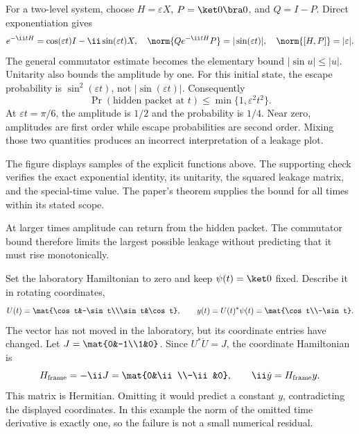 For a two-level system, choose $H=\varepsilon X$, $P=\ket0\bra0$, and $Q=I-P$. Direct exponentiation gives
\[
e^{-\ii tH}=\cos(\varepsilon t)I-\ii\sin(\varepsilon t)X,
\quad
\norm{Qe^{-\ii tH}P}=|\sin(\varepsilon t)|,
\quad\norm{[H,P]}=|\varepsilon|.
\]
The general commutator estimate becomes the elementary bound $|\sin u|\le |u|$. Unitarity also bounds the amplitude by one.
For this initial state, the escape probability is $\sin^2(\varepsilon t)$, not $|\sin(\varepsilon t)|$. Consequently
\[
\Pr(\text{hidden packet at }t)\le\min\{1,\varepsilon^2t^2\}.
\]
At $\varepsilon t=\pi/6$, the amplitude is $1/2$ and the probability is $1/4$. Near zero, amplitudes are first order while escape probabilities are second order. Mixing those two quantities produces an incorrect interpretation of a leakage plot.

The figure displays samples of the explicit functions above. The supporting check verifies the exact exponential identity, its unitarity, the squared leakage matrix, and the special-time value. The paper's theorem supplies the bound for all times within its stated scope.

At larger times amplitude can return from the hidden packet. The commutator bound therefore limits the largest possible leakage without predicting that it must rise monotonically.

Set the laboratory Hamiltonian to zero and keep $\psi(t)=\ket0$ fixed. Describe it in rotating coordinates,
\[
U(t)=\mat{\cos t&-\sin t\\\sin t&\cos t},
\qquad y(t)=U(t)^*\psi(t)=\mat{\cos t\\-\sin t}.
\]
The vector has not moved in the laboratory, but its coordinate entries have changed.
Let $J=\mat{0&-1\\1&0}$. Since $U^*\dot U=J$, the coordinate Hamiltonian is
\[
H_{\rm frame}=-\ii J=\mat{0&\ii\\-\ii&0},
\qquad \ii\dot y=H_{\rm frame}y.
\]
This matrix is Hermitian. Omitting it would predict a constant $y$, contradicting the displayed coordinates. In this example the norm of the omitted time derivative is exactly one, so the failure is not a small numerical residual.

